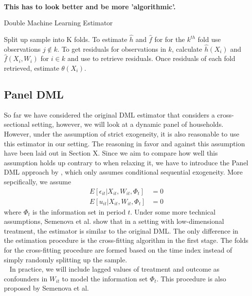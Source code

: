 \\
\textbf{This has to look better and be more 'algorithmic'.}
\begin{algorithm}
    \caption{Double Machine Learning Estimator}
    \begin{algorithmic}[1]
        \State Split up sample into K folds. 
        \State To estimate $\widehat{h}$ and $\widehat{f}$ for for the $k^{th}$ fold use observations $j \notin k$. 
        \State To get residuals for observations in $k$, calculate $\widehat{h}(X_i)$ and $\widehat{f}(X_i, W_i)$ for $i \in k$ and use to retrieve residuals.
        \State Once residuals of each fold retrieved, estimate $\theta(X_i)$.
    \end{algorithmic}
\end{algorithm}

\subsection{Panel DML} \label{sec:Panel DML}
So far we have considered the original DML estimator that considers a cross-sectional setting, however, we will look at a dynamic panel of households. However, under the assumption of strict exogeneity, it is also reasonable to use this estimator in our setting. The reasoning in favor and against this assumption have been laid out in Section X. Since we aim to compare how well this assumption holds up contrary to when relaxing it, we have to introduce the Panel DML approach by \cite{PanelDML}, which only assumes conditional sequential exogeneity. More sepcifically, we assume 
\begin{align*}
    E[\epsilon_{it}|X_{it}, W_{it}, \Phi_{t}]&=0 \\ 
    E[u_{it}|X_{it}, W_{it}, \Phi_{t}]&=0
\end{align*}
where $\Phi_t$ is the information set in period $t$. Under some more technical assumptions, Semenova et al. show that in a setting with low-dimensional treatment, the estimator is similar to the original DML. The only difference in the estimation procedure is the cross-fitting algorithm in the first stage. The folds for the cross-fitting procedure are formed based on the time index instead of simply randomly splitting up the sample. \\ 
In practice, we will include lagged values of treatment and outcome as confounders in $W_{it}$ to model the information set $\Phi_{t}$. This procedure is also proposed by Semenova et al. 

